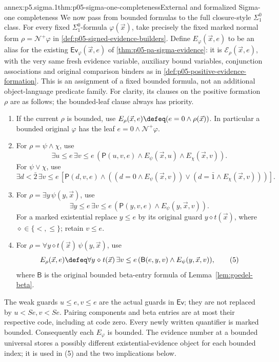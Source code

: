 \begin{annexitem}{annex:p5.sigma.1}{thm:p05-sigma-one-completeness}{External and formalized Sigma-one completeness}
We now pass from bounded formulas to the full closure-style
\(\Sigma^0_1\) class. For every fixed \(\Sigma^0_1\)-formula
\(\varphi(\vec x)\), take precisely the fixed marked normal form
\(\rho=\mathcal N^+\varphi\) in
\cref{def:p05-signed-evidence-builders}. Define
\(E_\varphi(\vec x,e)\) to be an alias for the existing
\(\mathsf{Ev}_\varphi(\vec x,e)\) of
\cref{thm:p05-pa-sigma-evidence}: it is
\(\mathcal E_\rho(\vec x,e)\), with the very same fresh evidence
variable, auxiliary bound variables, conjunction associations and original
comparison binders as in
\cref{def:p05-positive-evidence-formation}. This is an assignment of a
fixed bounded formula, not an additional object-language predicate family.
For clarity, its clauses on the positive formation \(\rho\) are as
follows; the bounded-leaf clause always has priority.
\begin{enumerate}
  \item If the current \(\rho\) is bounded, use
        \(E_\rho(\vec x,e)\defeq(e=0\land\rho(\vec x))\).
        In particular a bounded original \(\varphi\) has the leaf
        \(e=0\land\mathcal N^+\varphi\).
  \item For \(\rho=\psi\land\chi\), use
        \[
        \exists u\leq e\,\exists v\leq e\,
          (\mathsf P(u,v,e)\land E_\psi(\vec x,u)
                             \land E_\chi(\vec x,v)).
        \]
        For \(\psi\lor\chi\), use
        \[
        \exists d<\bar2\,\exists v\leq e\,
          [\mathsf P(d,v,e)\land
            ((d=0\land E_\psi(\vec x,v))\lor
             (d=\bar1\land E_\chi(\vec x,v)))].
        \]
  \item For \(\rho=\exists y\,\psi(y,\vec x)\), use
        \[
        \exists y\leq e\,\exists v\leq e\,
          (\mathsf P(y,v,e)\land E_\psi(y,\vec x,v)).
        \]
        For a marked existential replace \(y\leq e\) by its original
        guard \(y\mathrel\diamond t(\vec x)\), where
        \(\diamond\in\{<,\leq\}\); retain \(v\leq e\).
  \item For
        \(\rho=\forall y\mathrel\diamond t(\vec x)\,\psi(y,\vec x)\), use
        \[
        E_\rho(\vec x,e)\defeq
        \forall y\mathrel\diamond t(\vec x)\,
        \exists v\leq e\,
          (\mathsf B(e,y,v)\land E_\psi(y,\vec x,v)),              \tag{5}
        \]
        where \(\mathsf B\) is the original bounded beta-entry formula of
        Lemma~\ref{lem:goedel-beta}.
\end{enumerate}
The weak guards \(u\leq e,v\leq e\) are the actual guards in
\(\mathsf{Ev}\); they are not replaced by \(u<Se,v<Se\).
Pairing components and beta entries are at most their respective code,
including at code zero. Every newly written quantifier is marked bounded.
Consequently each \(E_\varphi\) is bounded. The evidence number at a
bounded universal stores a possibly different existential-evidence object
for each bounded index; it is used in (5) and the two implications below.


\end{annexitem}
